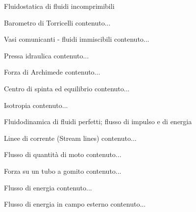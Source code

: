 \documentclass[a4paper,11pt]{report}
\begin{document}
	\begin{chapter}{Fluidostatica di fluidi incomprimibili}
		\begin{section}{Barometro di Torricelli}
			contenuto...
		\end{section}
		\begin{section}{Vasi comunicanti - fluidi immiscibili}
			contenuto...
		\end{section}
		\begin{section}{Pressa idraulica}
			contenuto...
		\end{section}
		\begin{section}{Forza di Archimede}
			contenuto...
		\end{section}
		\begin{section}{Centro di spinta ed equilibrio}
			contenuto...
		\end{section}
		\begin{section}{Isotropia}
			contenuto...
		\end{section}
	\end{chapter}

	\begin{chapter}{Fluidodinamica di fluidi perfetti; flusso di impulso e di energia}
		\begin{section}{Linee di corrente (Stream lines)}
			contenuto...
		\end{section}
		\begin{section}{Flusso di quantità di moto}
			contenuto...
		\end{section}
		\begin{section}{Forza su un tubo a gomito}
			contenuto...
		\end{section}
		\begin{section}{Flusso di energia}
			contenuto...
		\end{section}
		\begin{subsection}{Flusso di energia in campo esterno}
			contenuto...
		\end{subsection}
	\end{chapter}
\end{document}
